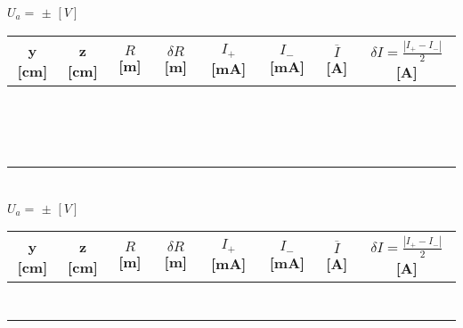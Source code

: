 \documentclass[a4paper,12pt]{article}  %
\begin{document}
\begin{table}[!hbp]
\noindent	$U_a =$ \underline{\makebox[1.5cm][r]{~}} $\pm$ \underline{\makebox[1cm][r]{~}} $[V]$ \\
	\begin{tabular}{|c|c|c|c|c|c|c|c|}
	\hline
	y [cm]  & z [cm]  & $R$ [m] & $\delta R$ [m] & $I_+$ [mA] & $I_-$ [mA] & $\overline{I}$ [A]	& {\tiny  $\delta I = \frac{| I_+ - I_-|}{2}$ } [A]  \\
	\hline
	 &  &  &  & &  &  & \\ \cline{5-6}
	 &  &  &  & &  & & \\ \cline{5-6}
	 &  &  &  & &  & & \\ \cline{5-6}
	 \hline
	 &  &  &  & &  & & \\ \cline{5-6}
	 &  &  &  & &  & & \\ \cline{5-6}
	 &  &  &  & &  & & \\ \cline{5-6}
	 \hline
	 &  &  &  & &  & & \\ \cline{5-6}
	 &  &  &  & &  & & \\ \cline{5-6}
	 &  &  &  & &  & & \\ \cline{5-6}
	 \hline
	 &  &  &  & &  & & \\ \cline{5-6}
	 &  &  &  & &  & & \\ \cline{5-6}
	 &  &  &  & &  & & \\ \cline{5-6}
	 \hline
	 &  &  &  & &  & & \\ \cline{5-6}
	 &  &  &  & &  & & \\ \cline{5-6}
	 &  &  &  & &  & & \\ \cline{5-6}
	 \hline
 	\end{tabular}\\
\noindent	$U_a =$ \underline{\makebox[1.5cm][r]{~}} $\pm$ \underline{\makebox[1cm][r]{~}} $[V]$ \\
	\begin{tabular}{|c|c|c|c|c|c|c|c|}
	\hline
	y [cm]  & z [cm]  & $R$ [m] & $\delta R$ [m] & $I_+$ [mA] & $I_-$ [mA] & $\overline{I}$ [A]	& {\tiny $\delta I = \frac{| I_+ - I_-|}{2}$ [A] } \\
	\hline
	 &  &  &  & &  &  & \\ \cline{5-6}
	 &  &  &  & &  & & \\ \cline{5-6}
	 &  &  &  & &  & & \\ \cline{5-6}
	 \hline
	 &  &  &  & &  & & \\ \cline{5-6}
	 &  &  &  & &  & & \\ \cline{5-6}
	 &  &  &  & &  & & \\ \cline{5-6}
	 \hline
	 &  &  &  & &  & & \\ \cline{5-6}

\end{tabular}
\end{table}
\end{document}
